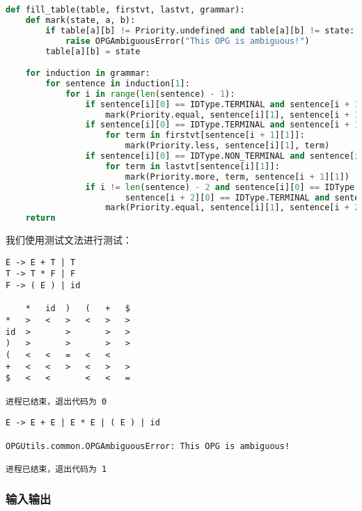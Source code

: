 \begin{lstlisting}[caption=构造算符优先级表，\texttt{OPGUtils.filltable}, language=python]
def fill_table(table, firstvt, lastvt, grammar):
    def mark(state, a, b):
        if table[a][b] != Priority.undefined and table[a][b] != state:
            raise OPGAmbiguousError("This OPG is ambiguous!")
        table[a][b] = state

    for induction in grammar:
        for sentence in induction[1]:
            for i in range(len(sentence) - 1):
                if sentence[i][0] == IDType.TERMINAL and sentence[i + 1][0] == IDType.TERMINAL:
                    mark(Priority.equal, sentence[i][1], sentence[i + 1][1])
                if sentence[i][0] == IDType.TERMINAL and sentence[i + 1][0] == IDType.NON_TERMINAL:
                    for term in firstvt[sentence[i + 1][1]]:
                        mark(Priority.less, sentence[i][1], term)
                if sentence[i][0] == IDType.NON_TERMINAL and sentence[i + 1][0] == IDType.TERMINAL:
                    for term in lastvt[sentence[i][1]]:
                        mark(Priority.more, term, sentence[i + 1][1])
                if i != len(sentence) - 2 and sentence[i][0] == IDType.TERMINAL and \
                        sentence[i + 2][0] == IDType.TERMINAL and sentence[i + 1][0] == IDType.NON_TERMINAL:
                    mark(Priority.equal, sentence[i][1], sentence[i + 2][1])
    return
\end{lstlisting}

我们使用测试文法进行测试：

\begin{lstlisting}[caption=测试文法1]
E -> E + T | T
T -> T * F | F
F -> ( E ) | id

    *   id  )   (   +   $
*   >   <   >   <   >   >
id  >       >       >   >
)   >       >       >   >
(   <   <   =   <   <
+   <   <   >   <   >   >
$   <   <       <   <   =

进程已结束，退出代码为 0
\end{lstlisting}

\begin{lstlisting}[caption=测试文法2]
E -> E + E | E * E | ( E ) | id 

OPGUtils.common.OPGAmbiguousError: This OPG is ambiguous!

进程已结束，退出代码为 1
\end{lstlisting}

\subsubsection{输入输出}

